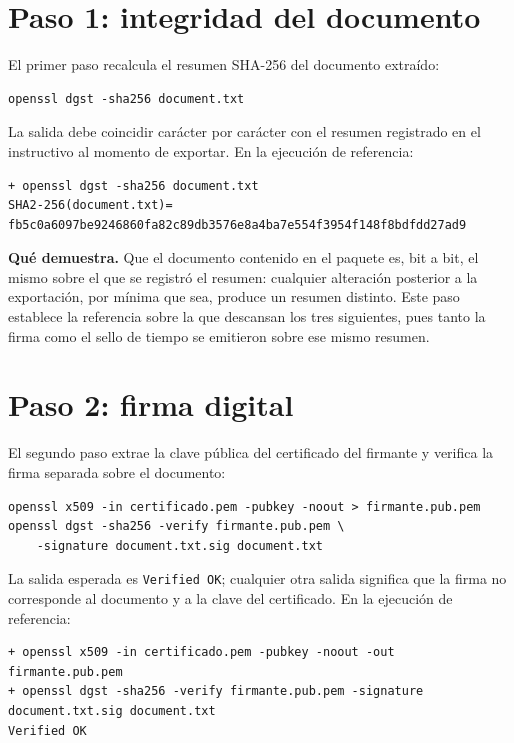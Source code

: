 \section{Paso 1: integridad del documento}\label{sec:verificacion-integridad}

El primer paso recalcula el resumen SHA-256 \cite{nist2015fips1804} del documento extraído:

\begin{lstlisting}[numbers=none]
openssl dgst -sha256 document.txt
\end{lstlisting}

La salida debe coincidir carácter por carácter con el resumen registrado en el instructivo al momento de exportar. En la ejecución de referencia:

\begin{lstlisting}[numbers=none]
+ openssl dgst -sha256 document.txt
SHA2-256(document.txt)= fb5c0a6097be9246860fa82c89db3576e8a4ba7e554f3954f148f8bdfdd27ad9
\end{lstlisting}

\textbf{Qué demuestra.} Que el documento contenido en el paquete es, bit a bit, el mismo sobre el que se registró el resumen: cualquier alteración posterior a la exportación, por mínima que sea, produce un resumen distinto. Este paso establece la referencia sobre la que descansan los tres siguientes, pues tanto la firma como el sello de tiempo se emitieron sobre ese mismo resumen.

\section{Paso 2: firma digital}\label{sec:verificacion-firma}

El segundo paso extrae la clave pública del certificado del firmante y verifica la firma separada sobre el documento:

\begin{lstlisting}[numbers=none]
openssl x509 -in certificado.pem -pubkey -noout > firmante.pub.pem
openssl dgst -sha256 -verify firmante.pub.pem \
    -signature document.txt.sig document.txt
\end{lstlisting}

La salida esperada es \texttt{Verified OK}; cualquier otra salida significa que la firma no corresponde al documento y a la clave del certificado. En la ejecución de referencia:

\begin{lstlisting}[numbers=none]
+ openssl x509 -in certificado.pem -pubkey -noout -out firmante.pub.pem
+ openssl dgst -sha256 -verify firmante.pub.pem -signature document.txt.sig document.txt
Verified OK
\end{lstlisting}

